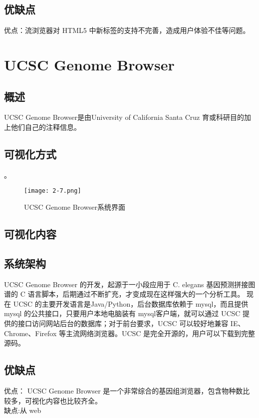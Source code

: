 		\subsection{优缺点}
		优点：流浏览器对 HTML5 中新标签的支持不完善，造成用户体验不佳等问题。
	\section{UCSC Genome Browser}		
			\subsection{概述}	
			UCSC Genome Browser是由University of California Santa Cruz 育或科研目的加上他们自己的注释信息。
			\subsection{可视化方式}		
			。 
			\begin{figure}[!ht]
				\centering
				\texttt{[image: 2-7.png]}
				\caption{UCSC Genome Browser系统界面}
			\end{figure}
			\subsection{可视化内容}		
			
			\subsection{系统架构}		
			UCSC Genome Browser 的开发，起源于一小段应用于 C. elegans 基因预测拼接图谱的 C 语言脚本，后期通过不断扩充，才变成现在这样强大的一个分析工具。 现在 UCSC 的主要开发语言是Java/Python，后台数据库依赖于 mysql，而且提供mysql 的公共接口，只要用户本地电脑装有 mysql客户端，就可以通过 UCSC 提供的接口访问网站后台的数据库；对于前台要求，UCSC 可以较好地兼容 IE、Chrome、Firefox 等主流网络浏览器。UCSC 是完全开源的，用户可以下载到完整源码。
			\subsection{优缺点}
			优点：	UCSC Genome Browser 是一个非常综合的基因组浏览器，包含物种数比较多，可视化内容也比较齐全。\\
			\indent 缺点:从 web 